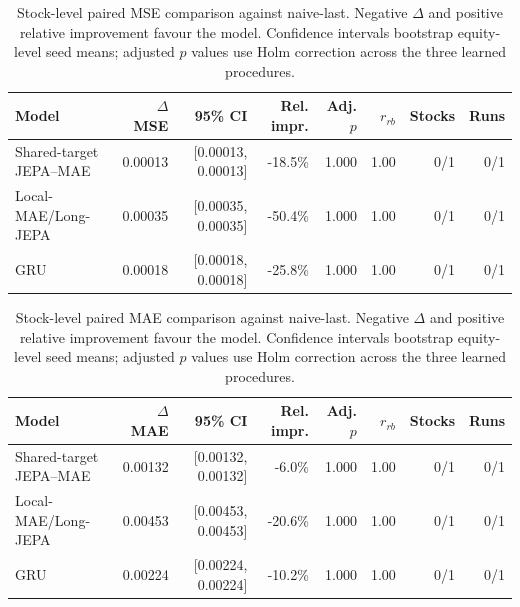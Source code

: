 \begin{table}[t]
\centering
\small
\caption{Stock-level paired MSE comparison against naive-last. Negative $\Delta$ and positive relative improvement favour the model. Confidence intervals bootstrap equity-level seed means; adjusted $p$ values use Holm correction across the three learned procedures.}
\label{tab:paired_mse_naive}
\begin{tabular}{lrrrrrrr}
\toprule
Model & $\Delta$MSE & 95\% CI & Rel. impr. & Adj. $p$ & $r_{rb}$ & Stocks & Runs \\
\midrule
Shared-target JEPA--MAE & 0.00013 & [0.00013, 0.00013] & -18.5\% & 1.000 & 1.00 & 0/1 & 0/1 \\
Local-MAE/Long-JEPA & 0.00035 & [0.00035, 0.00035] & -50.4\% & 1.000 & 1.00 & 0/1 & 0/1 \\
GRU & 0.00018 & [0.00018, 0.00018] & -25.8\% & 1.000 & 1.00 & 0/1 & 0/1 \\
\bottomrule
\end{tabular}
\end{table}

\begin{table}[t]
\centering
\small
\caption{Stock-level paired MAE comparison against naive-last. Negative $\Delta$ and positive relative improvement favour the model. Confidence intervals bootstrap equity-level seed means; adjusted $p$ values use Holm correction across the three learned procedures.}
\label{tab:paired_mae_naive}
\begin{tabular}{lrrrrrrr}
\toprule
Model & $\Delta$MAE & 95\% CI & Rel. impr. & Adj. $p$ & $r_{rb}$ & Stocks & Runs \\
\midrule
Shared-target JEPA--MAE & 0.00132 & [0.00132, 0.00132] & -6.0\% & 1.000 & 1.00 & 0/1 & 0/1 \\
Local-MAE/Long-JEPA & 0.00453 & [0.00453, 0.00453] & -20.6\% & 1.000 & 1.00 & 0/1 & 0/1 \\
GRU & 0.00224 & [0.00224, 0.00224] & -10.2\% & 1.000 & 1.00 & 0/1 & 0/1 \\
\bottomrule
\end{tabular}
\end{table}
